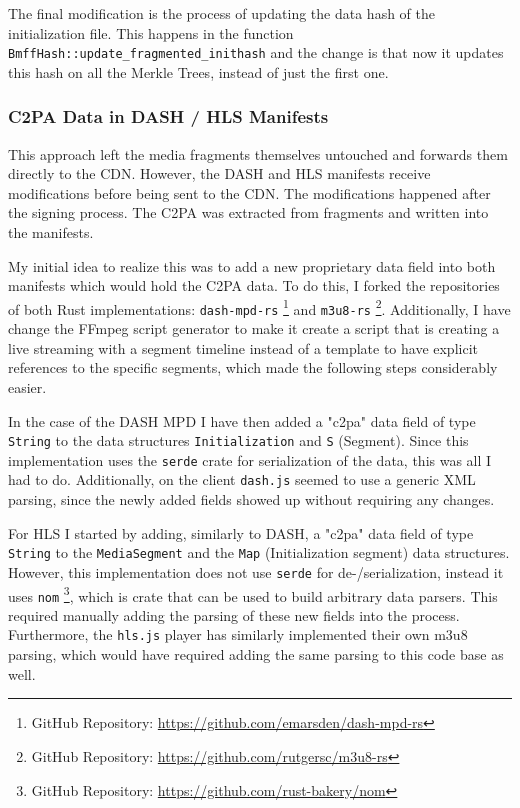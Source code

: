 The final modification is the process of updating the data hash of the initialization file. This happens in the function \texttt{BmffHash::update\_fragmented\_inithash} and the change is that now it updates this hash on all the Merkle Trees, instead of just the first one.

\subsubsection{C2PA Data in DASH / HLS Manifests\label{sec:in_manifest}}

This approach left the media fragments themselves untouched and forwards them directly to the CDN. However, the DASH and HLS manifests receive modifications before being sent to the CDN. The modifications happened after the signing process. The C2PA was extracted from fragments and written into the manifests.

My initial idea to realize this was to add a new proprietary data field into both manifests which would hold the C2PA data. To do this, I forked the repositories of both Rust implementations: \texttt{dash-mpd-rs} \footnote{GitHub Repository: \url{https://github.com/emarsden/dash-mpd-rs}} and \texttt{m3u8-rs} \footnote{GitHub Repository: \url{https://github.com/rutgersc/m3u8-rs}}. Additionally, I have change the FFmpeg script generator to make it create a script that is creating a live streaming with a segment timeline instead of a template to have explicit references to the specific segments, which made the following steps considerably easier.

In the case of the DASH MPD I have then added a "c2pa" data field of type \texttt{String} to the data structures \texttt{Initialization} and \texttt{S} (Segment). Since this implementation uses the \texttt{serde} crate for serialization of the data, this was all I had to do. Additionally, on the client \texttt{dash.js} seemed to use a generic XML parsing, since the newly added fields showed up without requiring any changes.

For HLS I started by adding, similarly to DASH, a "c2pa" data field of type \texttt{String} to the \texttt{MediaSegment} and the \texttt{Map} (Initialization segment) data structures. However, this implementation does not use \texttt{serde} for de-/serialization, instead it uses \texttt{nom} \footnote{GitHub Repository: \url{https://github.com/rust-bakery/nom}}, which is crate that can be used to build arbitrary data parsers. This required manually adding the parsing of these new fields into the process. Furthermore, the \texttt{hls.js} player has similarly implemented their own m3u8 parsing, which would have required adding the same parsing to this code base as well.


